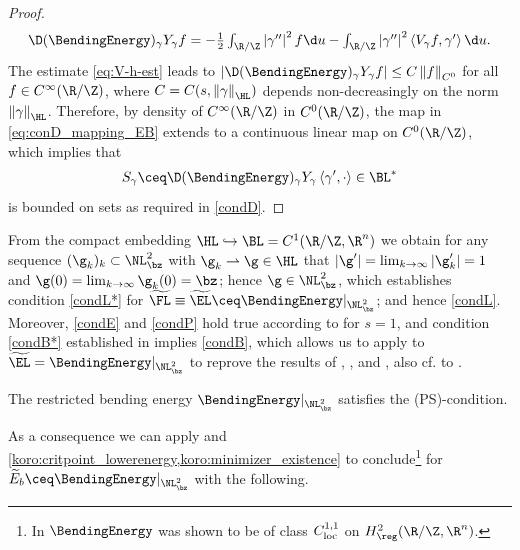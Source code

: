 \begin{proof}
\begin{equation}\label{eq:Eb_lowerorderrightinverse}
\begin{aligned}\textstyle
    \D(\BendingEnergy)_{\gamma}Y_{\gamma}f=-\frac{1}{2}\int_{\R/\Z}\left|\gamma'' \right|^2f\d u-\int_{\R/\Z}\left|\gamma'' \right|^2 \left\langle V_{\gamma}f,\gamma' \right\rangle\d u.
\end{aligned}
\end{equation}
The estimate \cref{eq:V-h-est} leads to $ \left|\D(\BendingEnergy)_{\gamma}Y_\gamma f \right|\le C\left\|f \right\|_{C^0} $ for all $ f\in  C^\infty(\R/\Z) $, where $ C=C(s,\left\|\gamma \right\|_{\HL}) $ depends non-decreasingly on the norm $ \left\|\gamma \right\|_{\HL} $. 
Therefore, by density of $ C^\infty(\R/\Z) $ in $ C^0(\R/\Z) $, the map in \cref{eq:conD_mapping_EB} extends to a continuous linear map on $ C^0(\R/\Z) $, which implies that 
\[S_{\gamma}\ceq \D(\BendingEnergy)_{\gamma}Y_\gamma \left\langle \gamma',\cdot \right\rangle\in \BL^* \]
is bounded on \Econtrolled{\BendingEnergy} sets as required in \ref{condD}. 
\end{proof}

From the
compact embedding $\HL\hookrightarrow\BL=C^1(\R/\Z,\R^n)$ we obtain
for any sequence $(\g_k)_k\subset\NL^2_{\bz}$ with $\g_k\rightharpoonup\g\in\HL$ that
$|\g'|=\lim_{k\to\infty}|\g_k'|=1$ and $\g(0)=\lim_{k\to\infty}\g_k(0)=\bz$; 
hence $\g\in\NL^2_{\bz}$, which establishes condition \ref{condL*} for 
$\widetilde{\FL}\equiv\widetilde{\EL} \ceq \BendingEnergy|_{\NL^2_{\bz}}$; and hence \ref{condL}.
Moreover, \ref{condE} and \ref{condP}
hold true according to  for $s=1$, and
condition \ref{condB*} established in 
implies \ref{condB}, which allows us
to apply  to $\widetilde{\EL}=\BendingEnergy|_{\NL^2_{\bz}}$
to reprove the results of \cite[Theorem 1.7]{langer-singer_1985},  
\cite[Section 5 Theorem 5.6]{schrader_2016}, and
\cite[Proposition 5.4]{okabe-schrader_2023}, also cf.
to \cite[Proposition 3.2]{linner_1998}.

\begin{bcorollary}
\label{cor:PS_elastic}
The restricted bending energy $\BendingEnergy|_{\NL^2_{\bz}}$ satisfies the
{\rm (PS)}-condition. 
\end{bcorollary}

As a consequence we can apply  and
\cref{koro:critpoint_lowerenergy,koro:minimizer_existence}   
to conclude\footnote{In \cite[Lemma 3.1]{okabe-schrader_2023}
$\BendingEnergy$ was shown
 to be of class
$C^{1,1}_\textnormal{loc}$ on $H^2_\reg(\R/\Z,\R^n)$.}
for $\widetilde{E}_b \ceq \BendingEnergy|_{\NL^2_{\bz}}$
with the following.

